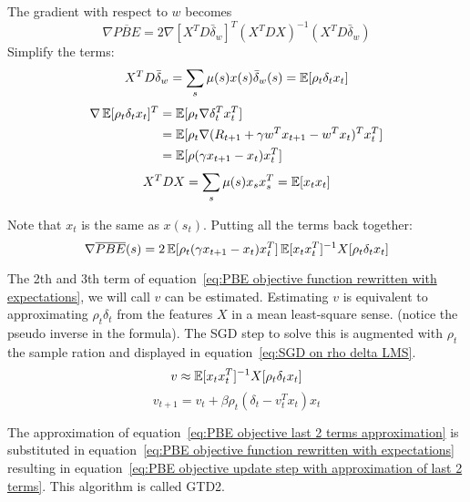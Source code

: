 The gradient with respect to $w$ becomes
\begin{equation}
\nabla\overline{PBE} = 2 \nabla [X^TD\bar{\delta}_w]^T (X^TDX)^{-1} (X^TD\bar{\delta}_w)
\end{equation}
Simplify the terms:
\begin{equation}
X^TD\bar{\delta}_w = \sum_s \mu(s)x(s)\bar{\delta}_w(s) = \operatorname{\mathbb{E}}[\rho_t\delta_tx_t]
\end{equation}
\begin{equation}
\begin{split}
\nabla \operatorname{\mathbb{E}}[\rho_t\delta_tx_t]^T & = \operatorname{\mathbb{E}}[\rho_t\nabla\delta_t^Tx_t^T] \\
& = \operatorname{\mathbb{E}}[\rho_t \nabla(R_{t+1} + \gamma w^Tx_{t+1} - w^Tx_t)^Tx_t^T] \\
& = \operatorname{\mathbb{E}}[\rho(\gamma x_{t+1} - x_t)x_t^T]
\end{split} 
\end{equation}
\begin{equation}
X^TDX = \sum_s \mu(s)x_sx_s^T = \operatorname{\mathbb{E}}[x_tx_t]
\end{equation}

Note that $x_t$ is the same as $x(s_t)$. Putting all the terms back together:
\begin{equation}
\nabla \overline{PBE}(s) = 2\operatorname{\mathbb{E}}[\rho_t(\gamma x_{t+1}-x_t)x^T_t]\operatorname{\mathbb{E}}[x_tx_t^T]^{-1}X[\rho_t\delta_tx_t]
\label{eq:PBE objective function rewritten with expectations}
\end{equation}
 
The 2th and 3th term of equation~\ref{eq:PBE objective function rewritten with expectations}, we will call $v$ can be estimated. Estimating $v$ is equivalent to approximating $\rho_t\delta_t$ from the features $X$ in a mean least-square sense. (notice the pseudo inverse in the formula). The SGD step to solve this is augmented with $\rho_t$ the sample ration and displayed in equation~\ref{eq:SGD on rho delta LMS}.
\begin{equation}
v\approx\operatorname{\mathbb{E}}[x_tx_t^T]^{-1}X[\rho_t\delta_tx_t]
\label{eq:PBE objective last 2 terms approximation}
\end{equation}
\begin{equation}
v_{t+1} = v_t + \beta \rho_t (\delta_t -v_t^Tx_t)x_t
\label{eq:SGD on rho delta LMS}
\end{equation}

The approximation of equation~\ref{eq:PBE objective last 2 terms approximation} is substituted in equation~\ref{eq:PBE objective function rewritten with expectations} resulting in equation~\ref{eq:PBE objective update step with approximation of last 2 terms}. This algorithm is called GTD2.

